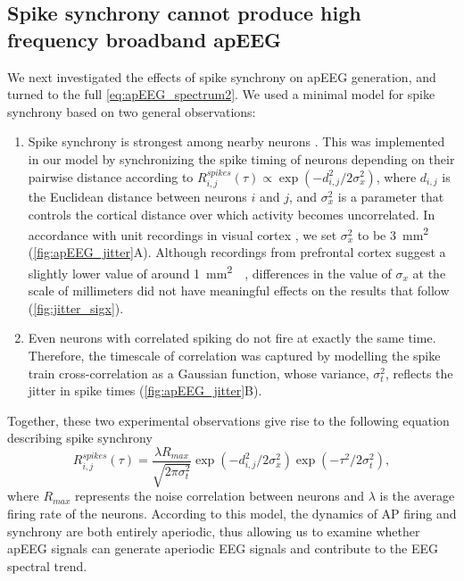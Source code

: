 \subsection{Spike synchrony cannot produce high frequency broadband apEEG}
We next investigated the effects of spike synchrony on apEEG generation, and turned to the full \ref{eq:apEEG_spectrum2}. We used a minimal model for spike synchrony based on two general observations:
\begin{enumerate}
\item Spike synchrony is strongest among nearby neurons \cite{Smith2008, Smith2013, Cohen2011}. This was implemented in our model by synchronizing the spike timing of neurons depending on their pairwise distance according to $R^{spikes}_{i,j}(\tau) \propto \exp(-d_{i,j}^2 / 2\sigma_x^2)$, where $d_{i,j}$ is the Euclidean distance between neurons $i$ and $j$, and $\sigma_x^2$ is a parameter that controls the cortical distance over which activity becomes uncorrelated. In accordance with unit recordings in visual cortex \cite{Smith2008, Smith2013}, we set $\sigma_x^2$ to be 3~\unit{\milli\meter^2}  ({\autoref{fig:apEEG_jitter}A}). Although recordings from prefrontal cortex suggest a slightly lower value of around 1~\unit{\milli\meter^2}~~\cite{Constantinidis2002},  differences in the value of $\sigma_x$ at the scale of millimeters did not have meaningful effects on the results that follow ({\autoref{fig:jitter_sigx}}).
\item Even neurons with correlated spiking do not fire at exactly the same time. Therefore, the timescale of correlation was captured by modelling the spike train cross-correlation as a Gaussian function, whose variance, $\sigma_t^2$, reflects the jitter in spike times  \cite{Bair2001, Smith2008, Smith2013, Cohen2011} ({\autoref{fig:apEEG_jitter}B}). 
\end{enumerate}
Together, these two experimental observations give rise to the following equation describing spike synchrony
\begin{equation} \label{eq:aperiodic_cross_correlation}
    R^{spikes}_{i,j}(\tau) = \frac{\lambda R_{max}}{\sqrt{2\pi \sigma_t^2}} \exp(-d_{i,j}^2 / 2\sigma_x^2) \exp(-\tau^2/2\sigma_t^2)\mathrm{,}
\end{equation} 
where $R_{max}$ represents the noise correlation between neurons \cite{Bair2001} and $\lambda$ is the average firing rate of the neurons. According to this model, the dynamics of AP firing and synchrony are both entirely aperiodic, thus allowing us to examine whether apEEG signals can generate aperiodic EEG signals and contribute to the EEG spectral trend.

